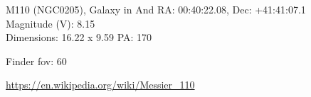 \begin{block}{M110 (NGC0205), Galaxy in And}
    RA: 00:40:22.08, Dec: +41:41:07.1 \\ 
    Magnitude (V): 8.15 \\ 
    Dimensions: 16.22 x 9.59 PA: 170 

    Finder fov: 60 

    \url{https://en.wikipedia.org/wiki/Messier_110} 
\end{block}